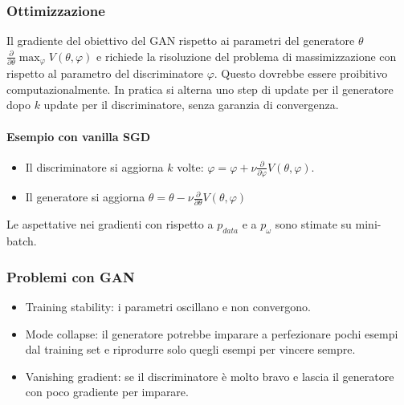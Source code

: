 		\subsubsection{Ottimizzazione}
		Il gradiente del obiettivo del GAN rispetto ai parametri del generatore $\theta$ $\frac{\partial}{\partial\theta}\max_\varphi V(\theta,\varphi)$ e richiede la risoluzione del problema di massimizzazione con rispetto al parametro del discriminatore $\varphi$.
		Questo dovrebbe essere proibitivo computazionalmente.
		In pratica si alterna uno step di update per il generatore dopo $k$ update per il discriminatore, senza garanzia di convergenza.
		
		\paragraph{Esempio con vanilla SGD}
		\begin{multicols}{2}
			\begin{itemize}
				\item Il discriminatore si aggiorna $k$ volte: $\varphi = \varphi + \nu\frac{\partial}{\partial\varphi}V(\theta,\varphi)$.
				\item Il generatore si aggiorna $\theta = \theta-\nu\frac{\partial}{\partial\theta}V(\theta,\varphi)$
			\end{itemize}
		\end{multicols}
		Le aspettative nei gradienti con rispetto a $p_{data}$ e a $p_\omega$ sono stimate su mini-batch.
		
		\subsubsection{Problemi con GAN}
		\begin{itemize}
			\item Training stability: i parametri oscillano e non convergono.
			\item Mode collapse: il generatore potrebbe imparare a perfezionare pochi esempi dal training set e riprodurre solo quegli esempi per vincere sempre.
			\item Vanishing gradient: se il discriminatore \`e molto bravo e lascia il generatore con poco gradiente per imparare.
		\end{itemize}
		
